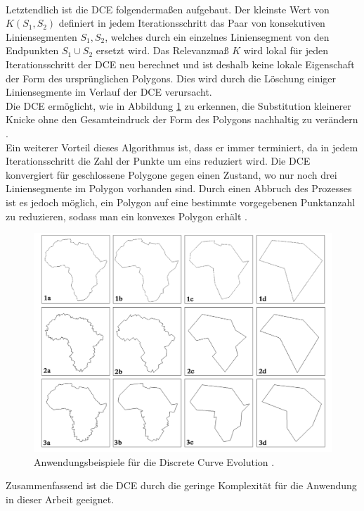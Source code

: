 { \\ 
 Letztendlich ist die DCE folgendermaßen aufgebaut. Der kleinste Wert von $K(S_1,S_2)$ definiert in jedem Iterationsschritt das Paar von konsekutiven Liniensegmenten $S_1, S_2$, welches durch ein einzelnes Liniensegment von den Endpunkten $S_1 \cup S_2$ ersetzt wird. Das Relevanzmaß $K$ wird lokal für jeden Iterationsschritt der DCE neu berechnet und ist deshalb keine lokale Eigenschaft der Form des ursprünglichen Polygons. Dies wird durch die Löschung einiger Liniensegmente im Verlauf der DCE verursacht.\\ Die DCE ermöglicht, wie in Abbildung \ref{Bsp_DCE_Bark_Paper} zu erkennen, die Substitution kleinerer Knicke ohne den Gesamteindruck der Form des Polygons nachhaltig zu verändern \citep{Barkowsky2000}.
 \\
 Ein weiterer Vorteil dieses Algorithmus ist, dass er immer terminiert, da in jedem Iterationsschritt die Zahl der Punkte um eins reduziert wird. Die DCE konvergiert für geschlossene Polygone gegen einen Zustand, wo nur noch drei Liniensegmente im Polygon vorhanden sind. Durch einen Abbruch des Prozesses ist es jedoch möglich, ein Polygon auf eine bestimmte vorgegebenen Punktanzahl zu reduzieren, sodass man ein konvexes Polygon erhält \citep{Barkowsky2000}. \\ 
 \begin{figure}[ht]
	   \centering
	   \includegraphics*[scale = 0.65, keepaspectratio, trim=2 2 2 2 ]{images/DCE/schem_maps_paper_DCE.png}
	   \caption[Anwendungsbeispiele für die \glqq Discrete Curve Evolution\grqq{}]{Anwendungsbeispiele für die \glqq Discrete Curve Evolution\grqq{}  \citep{Barkowsky2000}.}
	   \label{Bsp_DCE_Bark_Paper}
\end{figure}
Zusammenfassend ist die DCE durch die geringe Komplexität für die Anwendung in dieser Arbeit geeignet. 
}




